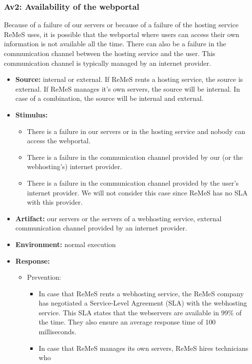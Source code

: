 \subsubsection{Av2: Availability of the webportal}
Because of a failure of our servers or because of a failure of the hosting service ReMeS uses,
it is possible that the webportal where users can access their own information is not available
all the time. There can also be a failure in the communication channel between the hosting service
and the user. This communication channel is typically managed by an internet provider.
\begin{itemize}
	\item \textbf{Source:} internal or external. If ReMeS rents a hosting service, the source is external.
							If ReMeS manages it's own servers, the source will be internal. In case of a 
							combination, the source will be internal and external.
	\item \textbf{Stimulus:}
		\begin{itemize}
			\item There is a failure in our servers or in the hosting service and nobody can access the webportal.
			\item There is a failure in the communication channel provided by our (or the webhosting's) internet provider.
			\item There is a failure in the communication channel provided by the user's internet provider. We will not consider this case since ReMeS has no SLA with this provider.
		\end{itemize}
	\item \textbf{Artifact:} our servers or the servers of a webhosting service, external communication channel provided by an internet provider.
	\item \textbf{Environment:} normal execution
	\item \textbf{Response:} 
		\begin{itemize}
			\item Prevention:
				\begin{itemize}
					\item In case that ReMeS rents a webhosting service, the ReMeS company has negotiated a Service-Level Agreement (SLA) with the
							webhosting service. This SLA states that the webservers are available in 99\% of the time. They also ensure an average
							response time of 100 milliseconds.
					\item In case that ReMeS manages its own servers, ReMeS hires technicians who

\end{itemize}
\end{itemize}
\end{itemize}
